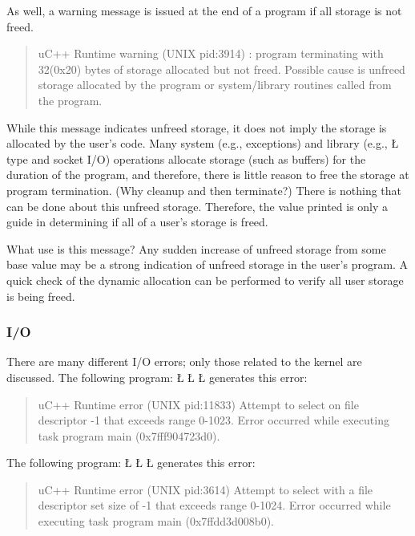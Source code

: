 \documentclass[openright,twoside]{report}
\begin{document}
As well, a warning message is issued at the end of a program if all storage is not freed.
\begin{quote}
\BGfont
uC++ Runtime warning (UNIX pid:3914) : program terminating with 32(0x20) bytes of storage allocated but not freed.
Possible cause is unfreed storage allocated by the program or system/library routines called from the program.
\end{quote}
While this message indicates unfreed storage, it does not imply the storage is allocated by the user's code.
Many system (e.g., exceptions) and library (e.g., \LGinlinetrue\LGbegin\lgrinde\L{}\endlgrinde\LGend{} type and socket I/O) operations allocate storage (such as buffers) for the duration of the program, and therefore, there is little reason to free the storage at program termination.
(Why cleanup and then terminate?)
There is nothing that can be done about this unfreed storage.
Therefore, the value printed is only a guide in determining if all of a user's storage is freed.

What use is this message?
Any sudden increase of unfreed storage from some base value may be a strong indication of unfreed storage in the user's program.
A quick check of the dynamic allocation can be performed to verify all user storage is being freed.


\subsubsection{I/O}

There are many different I/O errors;
only those related to the \uC kernel are discussed.
The following program:
\LGinlinefalse\LGbegin\lgrinde
\L{}
\L{\LB{}}
\L{\LB{\}}}
\endlgrinde\LGend
generates this error:
\begin{quote}
\BGfont
uC++ Runtime error (UNIX pid:11833) Attempt to select on file descriptor -1 that exceeds range 0-1023.
Error occurred while executing task program main (0x7fff904723d0).
\end{quote}

The following program:
\LGinlinefalse\LGbegin\lgrinde
\L{}
\L{\LB{}}
\L{\LB{\}}}
\endlgrinde\LGend
generates this error:
\begin{quote}
\BGfont
uC++ Runtime error (UNIX pid:3614) Attempt to select with a file descriptor set size of -1 that exceeds range 0-1024.
Error occurred while executing task program main (0x7ffdd3d008b0).
\end{quote}
\end{document}
